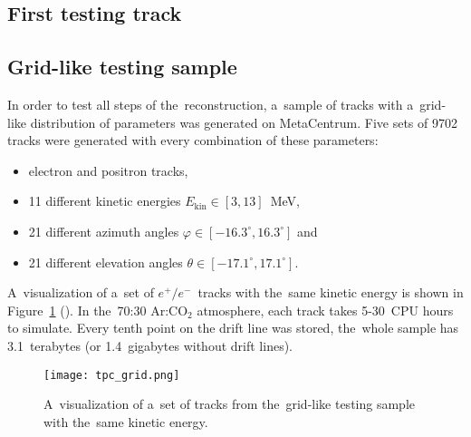		\subsection{First testing track}		
			
		\subsection{Grid-like testing sample}
		\label{sec:microgrid}
			In order to test all steps of the~reconstruction, a~sample of tracks with a~grid-like distribution of parameters was generated on MetaCentrum. Five sets of 9702 tracks were generated with every combination of these parameters:
				\begin{itemize}[nosep]
					\item electron and positron tracks,
					\item 11 different kinetic energies $E_\text{kin}\in[3,13]$~MeV,
					\item 21 different azimuth angles $\varphi \in [-16.3^\circ,16.3^\circ]$ and
					\item 21 different elevation angles $\theta \in [-17.1^\circ,17.1^\circ]$.
				\end{itemize}
			A~visualization of a~set of $e^+/e^-$~tracks with the~same kinetic energy is shown in Figure~\ref{fig:microgrid} (). In the~70:30 Ar:CO$_2$ atmosphere, each track takes 5-30~CPU hours to simulate. Every tenth point on the drift line was stored, the~whole sample has 3.1~terabytes (or 1.4~gigabytes without drift lines).
			
				\begin{figure}
					\centering
					\texttt{[image: tpc\_grid.png]}
					\caption{A~visualization of a~set of tracks from the~grid-like testing sample with the~same kinetic energy.}
					\label{fig:microgrid}
				\end{figure}
	
